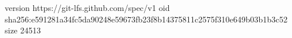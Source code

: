 version https://git-lfs.github.com/spec/v1
oid sha256:e591281a34fc5da90248e59673fb23f8b14375811c2575f310e649b03b1b3c52
size 24513
